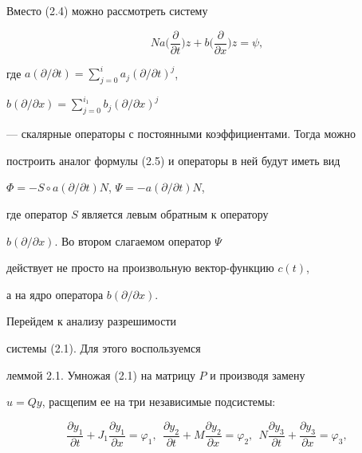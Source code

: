 \begin{notes}


Вместо (2.4) можно рассмотреть систему


$$


Na\bigg(\frac{\partial }{\partial t}\bigg )z+


b\bigg(\frac{\partial }{\partial x}\bigg )z=\psi ,


$$


где $a(\partial /\partial t)=\sum\limits_{j=0}^{i}a_j(\partial /\partial t)^j$,


$b(\partial /\partial x)=\sum\limits_{j=0}^{i_1}b_j(\partial /\partial x)^j$


--- скалярные операторы с постоянными коэффициентами. Тогда можно


построить аналог формулы (2.5) и операторы в ней будут иметь вид


$\Phi =-S\circ a(\partial /\partial t)N$, $\Psi =-a(\partial/\partial t)N$,


где оператор $S$ является левым обратным к оператору


$b(\partial /\partial x)$. Во втором слагаемом оператор $\Psi $


действует не просто на произвольную вектор-функцию $c(t)$,


а на ядро оператора $b(\partial /\partial x)$.


\end{notes}





Перейдем к анализу разрешимости


системы (2.1). Для этого воспользуемся


леммой 2.1. Умножая (2.1) на матрицу $P$ и производя замену


$u=Qy$, расщепим ее на три независимые подсистемы:


\begin{equation}


\frac{\partial{y_{1}} }{\partial t}+


J_{1}\frac{\partial{y_{1}} }{\partial x}=\varphi _1,\ \


\frac{\partial{y_{2}} }{\partial t}+


M\frac{\partial{y_{2}} }{\partial x}=\varphi _2,\ \


N\frac{\partial{y_{3}} }{\partial t}+


\frac{\partial{y_{3}} }{\partial x}=\varphi _3,


\end{equation}


